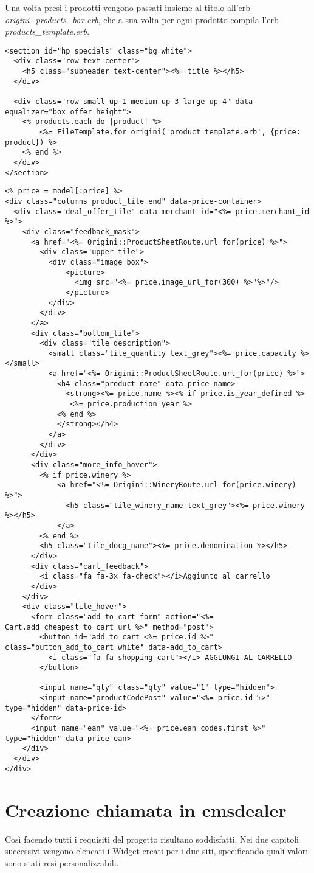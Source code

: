 Una volta presi i prodotti vengono passati insieme al titolo all'erb \emph{origini\_products\_box.erb}, che a sua volta per ogni prodotto
compila l'erb \emph{products\_template.erb}.
\newpage
\begin{lstlisting}[basicstyle=\tiny,caption={Il template \emph{origini\_products\_box.erb}}] 
<section id="hp_specials" class="bg_white">
  <div class="row text-center">
    <h5 class="subheader text-center"><%= title %></h5>
  </div>

  <div class="row small-up-1 medium-up-3 large-up-4" data-equalizer="box_offer_height">
    <% products.each do |product| %>
        <%= FileTemplate.for_origini('product_template.erb', {price: product}) %>
    <% end %>
  </div>
</section>
\end{lstlisting}
\begin{lstlisting}[basicstyle=\tiny, caption={Il template \emph{products\_template.erb}}] 
<% price = model[:price] %>
<div class="columns product_tile end" data-price-container>
  <div class="deal_offer_tile" data-merchant-id="<%= price.merchant_id %>">
    <div class="feedback_mask">
      <a href="<%= Origini::ProductSheetRoute.url_for(price) %>">
        <div class="upper_tile">
          <div class="image_box">
              <picture>
                <img src="<%= price.image_url_for(300) %>"%>"/>
              </picture>
          </div>
        </div>
      </a>
      <div class="bottom_tile">
        <div class="tile_description">
          <small class="tile_quantity text_grey"><%= price.capacity %></small>
          <a href="<%= Origini::ProductSheetRoute.url_for(price) %>">
            <h4 class="product_name" data-price-name>
              <strong><%= price.name %><% if price.is_year_defined %>
               <%= price.production_year %>
            <% end %>
            </strong></h4>
          </a>
        </div>
      </div>
      <div class="more_info_hover">
        <% if price.winery %>
            <a href="<%= Origini::WineryRoute.url_for(price.winery) %>">
              <h5 class="tile_winery_name text_grey"><%= price.winery %></h5>
            </a>
        <% end %>
        <h5 class="tile_docg_name"><%= price.denomination %></h5>
      </div>
      <div class="cart_feedback">
        <i class="fa fa-3x fa-check"></i>Aggiunto al carrello
      </div>
    </div>
    <div class="tile_hover">
      <form class="add_to_cart_form" action="<%= Cart.add_cheapest_to_cart_url %>" method="post">
        <button id="add_to_cart_<%= price.id %>" class="button_add_to_cart white" data-add_to_cart>
          <i class="fa fa-shopping-cart"></i> AGGIUNGI AL CARRELLO
        </button>

        <input name="qty" class="qty" value="1" type="hidden">
        <input name="productCodePost" value="<%= price.id %>" type="hidden" data-price-id>
      </form>
      <input name="ean" value="<%= price.ean_codes.first %>" type="hidden" data-price-ean>
    </div>
  </div>
</div>
\end{lstlisting}

\newpage
\section{Creazione chiamata in cmsdealer}

Così facendo tutti i requisiti del progetto risultano soddisfatti.
Nei due capitoli successivi vengono elencati i Widget creati per i due siti, specificando
quali valori sono stati resi personalizzabili.
